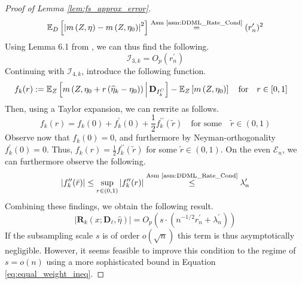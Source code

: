 \begin{proof}[Proof of Lemma \ref{lem:fs_approx_error}]
\begin{equation}
\begin{aligned}
            \mathbb{E}_{D}\left[\left|m\left(Z, \eta\right) - m\left(Z, \eta_{0}\right)\right|^{2}\right]
            \overset{\text{Asm \ref{asm:DDML_Rate_Cond}}}{=} (r_{n}^{\prime})^{2}
        \end{aligned}
    \end{equation}
    Using Lemma 6.1 from \citet{chernozhukov_doubledebiased_2018}, we can thus find the following.
    \begin{equation}
        \mathcal{I}_{3,k} = O_{p}(r_{n}^{\prime})
    \end{equation}
    Continuing with $\mathcal{I}_{4,k}$, introduce the following function.
    \begin{equation}
        \begin{aligned}
            f_{k}(r) 
            & := \mathbb{E}_{Z}\left[m\left(Z, \eta_{0} + r \left(\widehat{\eta}_{k} - \eta_{0}\right)\right) \, \middle| \, \mathbf{D}_{I_{k}^{C}}\right] - \mathbb{E}_{Z}\left[m\left(Z, \eta_{0}\right) \right] 
            \quad \text{for} \quad r \in [0,1]
        \end{aligned}
    \end{equation}
    Then, using a Taylor expansion, we can rewrite as follows.
    \begin{equation}
        f_{k}(r) = f_{k}(0) + f_{k}^{\prime}(0) + \frac{1}{2} f_{k}^{\prime\prime}(\tilde{r})
        \quad \text{for some} \quad \tilde{r} \in (0,1)
    \end{equation}
    Observe now that $f_{k}(0) = 0$, and furthermore by Neyman-orthogonality $f_{k}^{\prime}(0) = 0$.
    Thus, $f_{k}(r) = \frac{1}{2} f_{k}^{\prime\prime}(\tilde{r})$ for some $\tilde{r} \in (0,1)$.
    On the even $\mathcal{E}_{n}$, we can furthermore observe the following.
    \begin{equation}
        \left| f_{k}^{\prime\prime}(\tilde{r}) \right| 
        \leq \sup_{r \in (0,1)} \left| f_{k}^{\prime\prime}(r) \right|
        \overset{\text{Asm \ref{asm:DDML_Rate_Cond}}}{\leq} \lambda_{n}^{\prime}
    \end{equation}
    Combining these findings, we obtain the following result.
    \begin{equation}
         \left| \mathbf{R}_{k}\left(x; \mathbf{D}_{\ell}, \hat{\eta}\right) \right| 
         = O_{p}\left(s \cdot \left(n^{-1/2} r_{n}^{\prime} + \lambda_{n}^{\prime}\right)\right)
    \end{equation}
    If the subsampling scale $s$ is of order $o(\sqrt{n})$ this term is thus asymptotically negligible.
    However, it seems feasible to improve this condition to the regime of $s = o(n)$ using a more sophisticated bound in Equation \ref{eq:equal_weight_ineq}.
\end{proof}



